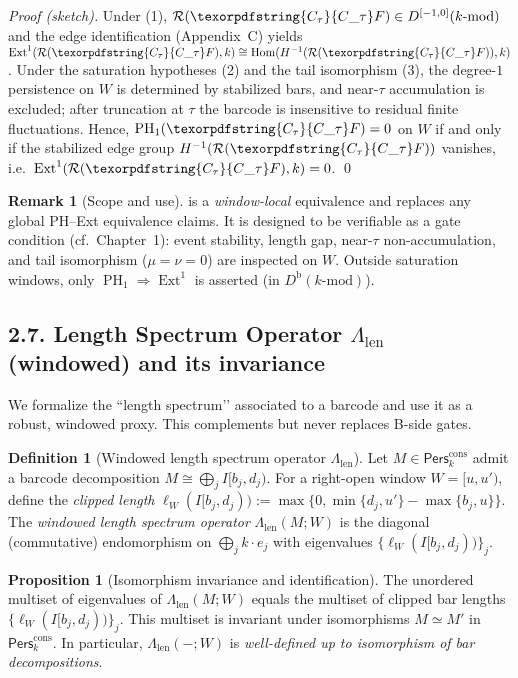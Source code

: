 \documentclass[11pt]{article}
\numberwithin{equation}{section}
\theoremstyle{plain}
\theoremstyle{definition}
\theoremstyle{remark}
\DeclareMathOperator{\Ext}{Ext}
\DeclareMathOperator{\Hom}{Hom}
\DeclareMathOperator{\PH}{PH}
\newcommand{\Pers}{\mathsf{Pers}}
\theoremstyle{plain}
\theoremstyle{definition}
\numberwithin{equation}{section}
\newtheorem{proposition}[theorem]{Proposition}
\theoremstyle{definition}
\newtheorem{definition}[theorem]{Definition}
\newtheorem{remark}[theorem]{Remark}
\DeclareRobustCommand{\Ctau}{\texorpdfstring{\ensuremath{C_{\tau}}}{C\_\tau}}
\numberwithin{equation}{section}
\theoremstyle{plain}
\theoremstyle{definition}
\theoremstyle{remark}
\newcommand{\Dbk}{D^{\mathrm{b}}(k\text{-mod})}
\newcommand{\Perscons}{\Pers^{\mathrm{cons}}_k}
\newcommand{\Len}{\Lambda_{\mathrm{len}}}
\providecommand{\Cfun}[1]{\mathsf{C}_{#1}}
\providecommand{\Ctau}{\Cfun{\tau}}
\begin{document}
\noindent\emph{Proof (sketch).} Under (1), \(\mathcal{R}(\Ctau F)\in D^{[-1,0]}(k\text{-mod})\) and the edge identification (Appendix~C) yields \(\Ext^1(\mathcal{R}(\Ctau F),k)\cong \Hom(H^{-1}(\mathcal{R}(\Ctau F)),k)\). Under the saturation hypotheses (2) and the tail isomorphism (3), the degree-\(1\) persistence on \(W\) is determined by stabilized bars, and near-\(\tau\) accumulation is excluded; after truncation at \(\tau\) the barcode is insensitive to residual finite fluctuations. Hence, \(\PH_1(\Ctau F)=0\) on \(W\) if and only if the stabilized edge group \(H^{-1}(\mathcal{R}(\Ctau F))\) vanishes, i.e.\ \(\Ext^1(\mathcal{R}(\Ctau F),k)=0\). \qed

\begin{remark}[Scope and use]
 is a \emph{window-local} equivalence and replaces any global PH–Ext equivalence claims. It is designed to be verifiable as a gate condition (cf.\ Chapter~1): event stability, length gap, near-\(\tau\) non-accumulation, and tail isomorphism (\(\mu=\nu=0\)) are inspected on \(W\). Outside saturation windows, only \(\PH_1\Rightarrow \Ext^1\) is asserted (in \(\Dbk\)).
\end{remark}

\subsection*{2.7. Length Spectrum Operator \texorpdfstring{$\Len$}{Lambda\_len} (windowed) and its invariance}
We formalize the “length spectrum’’ associated to a barcode and use it as a robust, windowed proxy. This complements but never replaces B-side gates.

\begin{definition}[Windowed length spectrum operator \(\Len\)]\label{def:len-operator}
Let \(M\in\Perscons\) admit a barcode decomposition \(M\cong \bigoplus_{j} I[b_j,d_j)\).
For a right-open window \(W=[u,u')\), define the \emph{clipped length} \(\ell_W(I[b_j,d_j)):=\max\{0,\min\{d_j,u'\}-\max\{b_j,u\}\}\). The \emph{windowed length spectrum operator} \(\Len(M;W)\) is the diagonal (commutative) endomorphism on \(\bigoplus_j k\cdot e_j\) with eigenvalues \(\{\ell_W(I[b_j,d_j))\}_j\).
\end{definition}

\begin{proposition}[Isomorphism invariance and identification]\label{prop:length-spectrum}
The unordered multiset of eigenvalues of \(\Len(M;W)\) equals the multiset of clipped bar lengths \(\{\ell_W(I[b_j,d_j))\}_j\). This multiset is invariant under isomorphisms \(M\simeq M'\) in \(\Perscons\). In particular, \(\Len(-;W)\) is \emph{well-defined up to isomorphism of bar decompositions}.
\end{proposition}
\end{document}
